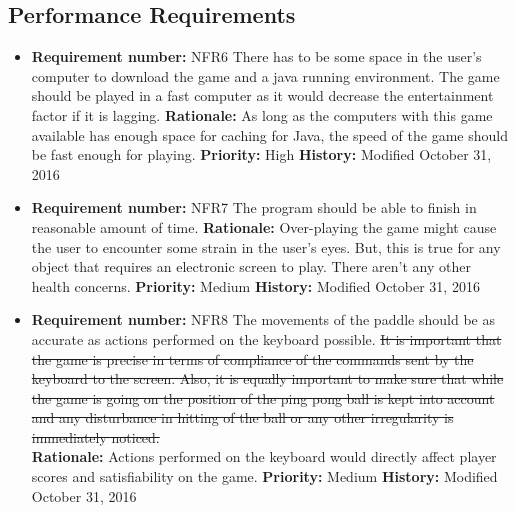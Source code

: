 \documentclass[12pt,letterpaper]{article}
\begin{document}
\subsection{Performance Requirements}
\begin{reqbox}
	\begin{itemize}
\subsubsection{Speed requirement}
\item \textbf{Requirement number: }NFR6
   	There has to be some space in the user’s computer to download the game and a java running environment. The game should be played in a fast computer as it would decrease the entertainment factor if it is lagging.
		\textbf{Rationale: } As long as the computers with this game available has enough space for caching for Java, the speed of the game should be fast enough for playing.
		\textbf{Priority: }High
		\textbf{History: }Modified October 31, 2016
	\end{itemize}
\end{reqbox}
\begin{reqbox}
	\begin{itemize}
\subsubsection{Safety critical requirement}
\item \textbf{Requirement number: }NFR7
	The program should be able to finish in reasonable amount of time.  
		\textbf{Rationale: } Over-playing the game might cause the user to encounter some strain in the user’s eyes. But, this is true for any object that requires an electronic screen to play. There aren’t any other health concerns.
		\textbf{Priority: }Medium
		\textbf{History: }Modified October 31, 2016
	\end{itemize}
\end{reqbox}
\begin{reqbox}
	\begin{itemize}
\subsubsection{Precision requirement}
\item \textbf{Requirement number: }NFR8
		The movements of the paddle should be as accurate as actions performed on the keyboard possible.
\st{   	It is important that the game is precise in terms of compliance of the commands sent by the keyboard to the screen. Also, it is equally important to make sure that while the game is going on the position of the ping pong ball is kept into account and any disturbance in hitting of the ball or any other irregularity is immediately noticed.\\
}
		\textbf{Rationale: } Actions performed on the keyboard would directly affect player scores and satisfiability on the game.
		\textbf{Priority: }Medium
		\textbf{History: }Modified October 31, 2016
	\end{itemize}
\end{reqbox}
\end{document}
